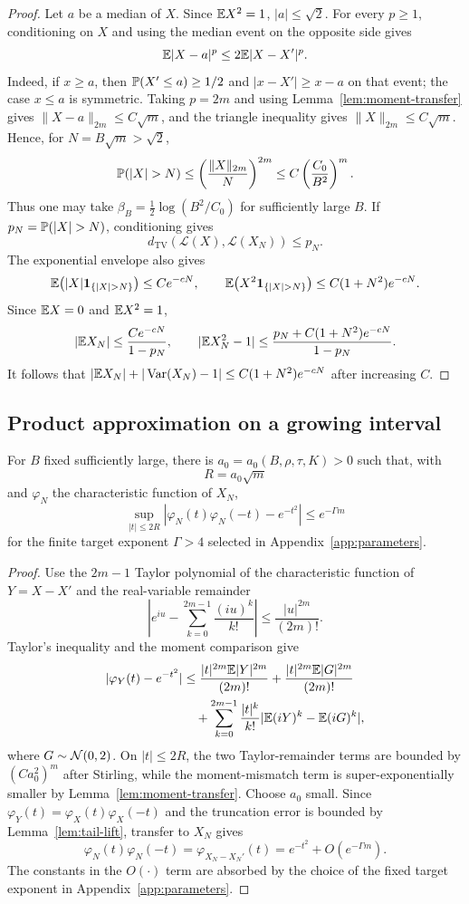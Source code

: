 \begin{proof}
Let $a$ be a median of $X$. Since $\mathbb E X^2=1$, $|a|\le\sqrt2$.
For every $p\ge1$, conditioning on $X$ and using the median event on the opposite side gives
\[
\mathbb E|X-a|^p\le2\mathbb E|X-X'|^p.
\]
Indeed, if $x\ge a$, then $\mathbb P(X'\le a)\ge1/2$ and $|x-X'|\ge x-a$ on that event; the case $x\le a$ is symmetric. Taking $p=2m$ and using Lemma~\ref{lem:moment-transfer} gives $\|X-a\|_{2m}\le C\sqrt m$, and the triangle inequality gives $\|X\|_{2m}\le C\sqrt m$. Hence, for $N=B\sqrt m>\sqrt2$,
\[
\Pp(|X|>N)
\le \left(\frac{\|X\|_{2m}}{N}\right)^{2m}
\le C\left(\frac{C_0}{B^2}\right)^m.
\]
Thus one may take $\beta_B=\frac12\log(B^2/C_0)$ for sufficiently large $B$. If $p_N=\Pp(|X|>N)$, conditioning gives
\[
d_{\mathrm{TV}}(\mathcal L(X),\mathcal L(X_N))\le p_N.
\]
The exponential envelope also gives
\[
\E\bigl(|X|\mathbf1_{\{|X|>N\}}\bigr)\le Ce^{-cN},
\qquad
\E\bigl(X^2\mathbf1_{\{|X|>N\}}\bigr)\le C(1+N^2)e^{-cN}.
\]
Since $\mathbb E X=0$ and $\mathbb E X^2=1$,
\[
|\mathbb E X_N|\le\frac{Ce^{-cN}}{1-p_N},
\qquad
|\mathbb E X_N^2-1|\le\frac{p_N+C(1+N^2)e^{-cN}}{1-p_N}.
\]
It follows that $|\mathbb E X_N|+|\operatorname{Var}(X_N)-1|\le C(1+N^2)e^{-cN}$ after increasing $C$.
\end{proof}

\subsection{Product approximation on a growing interval}

\begin{lemma}\label{lem:real-window}
For $B$ fixed sufficiently large, there is $a_0=a_0(B,\rho,\tau,K)>0$ such that, with
\[
R=a_0\sqrt m
\]
and $\varphi_N$ the characteristic function of $X_N$,
\[
\sup_{|t|\le2R}
\left|\varphi_N(t)\varphi_N(-t)-e^{-t^2}\right|
\le e^{-\Gamma m}
\]
for the finite target exponent $\Gamma>4$ selected in Appendix~\ref{app:parameters}.
\end{lemma}

\begin{proof}
Use the $2m-1$ Taylor polynomial of the characteristic function of $Y=X-X'$ and the real-variable remainder
\[
\left|e^{iu}-\sum_{k=0}^{2m-1}\frac{(iu)^k}{k!}\right|
\le\frac{|u|^{2m}}{(2m)!}.
\]
Taylor's inequality and the moment comparison give
\[
\begin{aligned}
|\varphi_Y(t)-e^{-t^2}|
&\le \frac{|t|^{2m}\mathbb E|Y|^{2m}}{(2m)!}
 +\frac{|t|^{2m}\mathbb E|G|^{2m}}{(2m)!}\\
&\quad+\sum_{k=0}^{2m-1}\frac{|t|^k}{k!}
 |\mathbb E(iY)^k-\mathbb E(iG)^k|,
\end{aligned}
\]
where $G\sim\mathcal N(0,2)$. On $|t|\le2R$, the two Taylor-remainder terms are bounded by $(Ca_0^2)^m$ after Stirling, while the moment-mismatch term is super-exponentially smaller by Lemma~\ref{lem:moment-transfer}. Choose $a_0$ small. Since $\varphi_Y(t)=\varphi_X(t)\varphi_X(-t)$ and the truncation error is bounded by Lemma~\ref{lem:tail-lift}, transfer to $X_N$ gives
\[
\varphi_N(t)\varphi_N(-t)=\varphi_{X_N-X_N'}(t)=e^{-t^2}+O(e^{-\Gamma m}).
\]
The constants in the $O(\cdot)$ term are absorbed by the choice of the fixed target exponent in Appendix~\ref{app:parameters}.
\end{proof}

